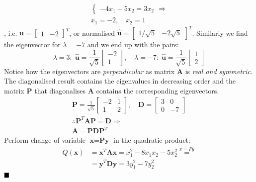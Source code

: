 \documentclass[a4paper]{article}
\numberwithin{equation}{section} %
\newcommand{\eqtext}[1]{\ensuremath{\stackrel{\text{#1}}=}} %
\newcommand{\qedblack}{$\hfill\blacksquare$} %
\begin{document}
\begin{TheSolution}
\begin{equation*}
\begin{gathered}
\begin{cases}
    -4x_{1}-5x_{2}=3x_{2}
    \end{cases}\Longrightarrow \\
    x_{1}=-2,\quad x_{2}=1
  \end{gathered}
\end{equation*}
, i.e. $\textbf{u}=\begin{bmatrix}1&-2\end{bmatrix}^{T}$, or normalised $\hat{\textbf{u}}=\begin{bmatrix}1/\sqrt{5}&-2\sqrt{5}\end{bmatrix}^{T}$. Similarly we find the eigenvector for $\lambda=-7$ and we end up with the pairs:
\begin{equation*}
\lambda=3:\;\hat{\textbf{u}}=\frac{1}{\sqrt{5}}\begin{bmatrix}-2\\1\end{bmatrix},\quad
\lambda=-7:\;\hat{\textbf{u}}=\frac{1}{\sqrt{5}}\begin{bmatrix}1\\2\end{bmatrix}
\end{equation*}
Notice how the eigenvectors are \textit{perpendicular} as matrix $\textbf{A}$ is \textit{real and symmetric}. The diagonalised result contains the eigenvalues in decreasing order and the  matrix $\textbf{P}$ that diagonalises $\textbf{A}$ contains the corresponding eigenvectors.
\begin{equation*}
  \begin{gathered}
  \textbf{P}=\frac{1}{\sqrt{5}}\begin{bmatrix}
  -2	&	1\\
  1	&	2
  \end{bmatrix}, \quad
  \textbf{D}=\begin{bmatrix}
  3	&	0\\
  0	&	-7
  \end{bmatrix}\\
  \therefore
  \textbf{P}^{T}\textbf{AP}=\textbf{D}\Longrightarrow \\
  \textbf{A}=\textbf{PDP}^{T}
  \end{gathered}
\end{equation*}
Perform change of variable $\textbf{x}=\textbf{Py}$ in the quadratic product:
  \begin{equation*}
  \begin{split}
  Q(\textbf{x})&=\textbf{x}^{T}\textbf{Ax}=x_{1}^{2}-8x_{1}x_{2}-5x_{2}^{2}\eqtext{$x=Py$}\\
  &=\textbf{y}^{T}\textbf{Dy}=3y_{1}^{2}-7y_{2}^{2}
  \end{split}
  \end{equation*}
  \qedblack
\end{TheSolution}
\end{document}

